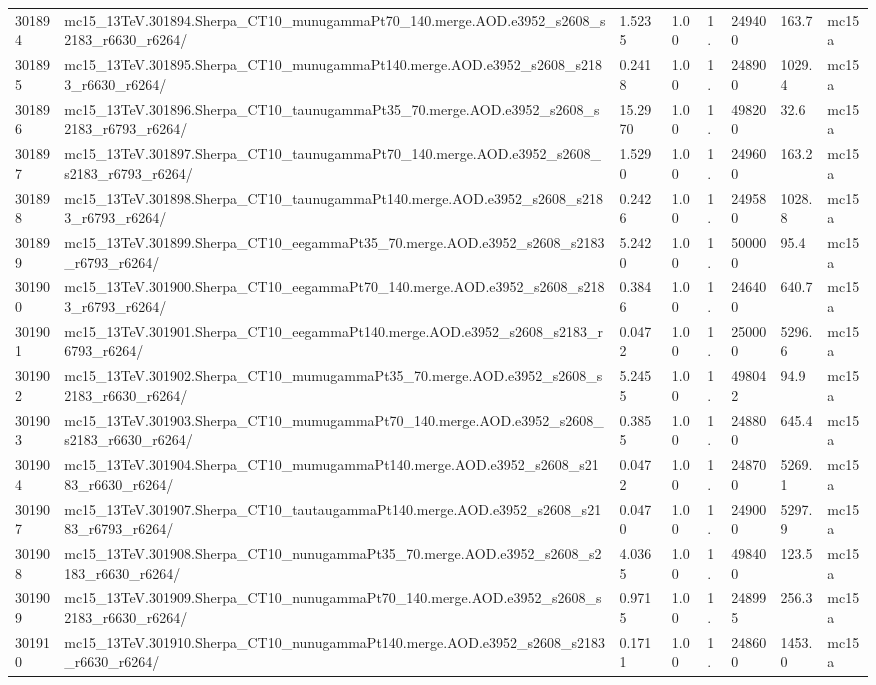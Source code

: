 \begin{sidewaystable}[!hp]
\begin{center}
{\begin{tabular}{llllllll}
301894  &  mc15\_13TeV.301894.Sherpa\_CT10\_munugammaPt70\_140.merge.AOD.e3952\_s2608\_s2183\_r6630\_r6264/  &  1.5235  &  1.00  &  1.  &  249400  &  163.7 &  mc15a \\
301895  &  mc15\_13TeV.301895.Sherpa\_CT10\_munugammaPt140.merge.AOD.e3952\_s2608\_s2183\_r6630\_r6264/  &  0.2418  &  1.00  &  1.  &  248900  &  1029.4 &  mc15a \\
301896  &  mc15\_13TeV.301896.Sherpa\_CT10\_taunugammaPt35\_70.merge.AOD.e3952\_s2608\_s2183\_r6793\_r6264/  &  15.2970  &  1.00  &  1.  &  498200  &  32.6 &  mc15a \\
301897  &  mc15\_13TeV.301897.Sherpa\_CT10\_taunugammaPt70\_140.merge.AOD.e3952\_s2608\_s2183\_r6793\_r6264/  &  1.5290  &  1.00  &  1.  &  249600  &  163.2 &  mc15a \\
301898  &  mc15\_13TeV.301898.Sherpa\_CT10\_taunugammaPt140.merge.AOD.e3952\_s2608\_s2183\_r6793\_r6264/  &  0.2426  &  1.00  &  1.  &  249580  &  1028.8 &  mc15a \\
301899  &  mc15\_13TeV.301899.Sherpa\_CT10\_eegammaPt35\_70.merge.AOD.e3952\_s2608\_s2183\_r6793\_r6264/  &  5.2420  &  1.00  &  1.  &  500000  &  95.4 &  mc15a \\
301900  &  mc15\_13TeV.301900.Sherpa\_CT10\_eegammaPt70\_140.merge.AOD.e3952\_s2608\_s2183\_r6793\_r6264/  &  0.3846  &  1.00  &  1.  &  246400  &  640.7 &  mc15a \\
301901  &  mc15\_13TeV.301901.Sherpa\_CT10\_eegammaPt140.merge.AOD.e3952\_s2608\_s2183\_r6793\_r6264/  &  0.0472  &  1.00  &  1.  &  250000  &  5296.6 &  mc15a \\
301902  &  mc15\_13TeV.301902.Sherpa\_CT10\_mumugammaPt35\_70.merge.AOD.e3952\_s2608\_s2183\_r6630\_r6264/  &  5.2455  &  1.00  &  1.  &  498042  &  94.9 &  mc15a \\
301903  &  mc15\_13TeV.301903.Sherpa\_CT10\_mumugammaPt70\_140.merge.AOD.e3952\_s2608\_s2183\_r6630\_r6264/  &  0.3855  &  1.00  &  1.  &  248800  &  645.4 &  mc15a \\
301904  &  mc15\_13TeV.301904.Sherpa\_CT10\_mumugammaPt140.merge.AOD.e3952\_s2608\_s2183\_r6630\_r6264/  &  0.0472  &  1.00  &  1.  &  248700  &  5269.1 &  mc15a \\
301907  &  mc15\_13TeV.301907.Sherpa\_CT10\_tautaugammaPt140.merge.AOD.e3952\_s2608\_s2183\_r6793\_r6264/  &  0.0470  &  1.00  &  1.  &  249000  &  5297.9 &  mc15a \\
301908  &  mc15\_13TeV.301908.Sherpa\_CT10\_nunugammaPt35\_70.merge.AOD.e3952\_s2608\_s2183\_r6630\_r6264/  &  4.0365  &  1.00  &  1.  &  498400  &  123.5 &  mc15a \\
301909  &  mc15\_13TeV.301909.Sherpa\_CT10\_nunugammaPt70\_140.merge.AOD.e3952\_s2608\_s2183\_r6630\_r6264/  &  0.9715  &  1.00  &  1.  &  248995  &  256.3 &  mc15a \\
301910  &  mc15\_13TeV.301910.Sherpa\_CT10\_nunugammaPt140.merge.AOD.e3952\_s2608\_s2183\_r6630\_r6264/  &  0.1711  &  1.00  &  1.  &  248600  &  1453.0 &  mc15a \\
\hline


\end{tabular}}
\end{center}
\end{sidewaystable}
